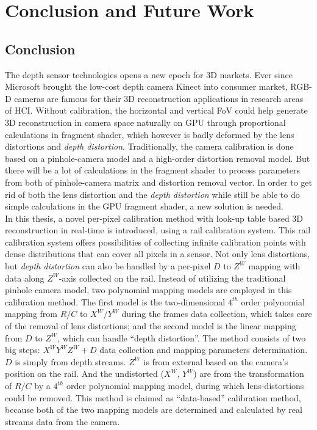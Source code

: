 \chapter{Conclusion and Future Work} %
\label{chapterConclusionAndFutureWork} 

\section{Conclusion}
\indent
The depth sensor technologies opens a new epoch for 3D markets. Ever since Microsoft brought the low-cost depth camera Kinect into consumer market, RGB-D cameras are famous for their 3D reconstruction applications in research areas of HCI. Without calibration, the horizontal and vertical FoV could help generate 3D reconstruction in camera space naturally on GPU through proportional calculations in fragment shader, which however is badly deformed by the lens distortions and \emph{depth distortion}. Traditionally, the camera calibration is done based on a pinhole-camera model and a high-order distortion removal model. But there will be a lot of calculations in the fragment shader to process parameters from both of pinhole-camera matrix and distortion removal vector. In order to get rid of both the lens distortion and the \emph{depth distortion} while still be able to do simple calculations in the GPU fragment shader, a new solution is needed.
\\\indent
In this thesis, a novel per-pixel calibration method with look-up table based 3D reconstruction in real-time is introduced, using a rail calibration system. This rail calibration system offers possibilities of collecting infinite calibration points with dense distributions that can cover all pixels in a sensor. Not only lens distortions, but \emph{depth distortion} can also be handled by a per-pixel \(D\) to \(Z^W\) mapping with data along \(Z^W\)-axis collected on the rail. Instead of utilizing the traditional pinhole camera model, two polynomial mapping models are employed in this calibration method. The first model is the two-dimensional \(4^{th}\) order polynomial mapping from \(R/C\) to \(X^W/Y^W\) during the frames data collection, which takes care of the removal of lens distortions; and the second model is the linear mapping from \(D\) to \(Z^W\), which can handle \enquote{depth distortion}. The method consists of two big steps: \(X^WY^WZ^W+D\) data collection and mapping parameters determination. \(D\) is simply from depth streams. \(Z^W\) is from external based on the camera's position on the rail. And the undistorted (\(X^W, \, Y^W\)) are from the transformation of \(R/C\) by a \(4^{th}\) order polynomial mapping model, during which lens-distortions could be removed. This method is claimed as \enquote{data-based} calibration method, because both of the two mapping models are determined and calculated by real streams data from the camera. 
